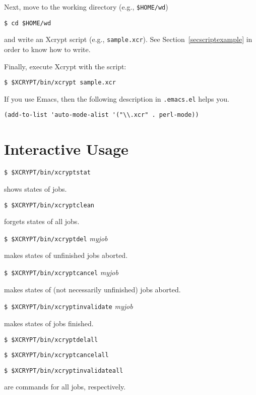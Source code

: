 \documentclass[a4paper,10pt]{report}
\begin{document}
Next, move to the working directory (e.g., \texttt{\$HOME/wd})
\begin{screen}
\texttt{\$ cd \$HOME/wd}
\end{screen}
and write an Xcrypt script (e.g., \texttt{sample.xcr}).  See
Section~\ref{secscriptexample} in order to know how to write.

Finally, execute Xcrypt with the script:
\begin{screen}
\texttt{\$ \$XCRYPT/bin/xcrypt sample.xcr}
\end{screen}

If you use Emacs, then the following description in \texttt{.emacs.el}
helps you.
\begin{boxnote}
\begin{verbatim}
(add-to-list 'auto-mode-alist '("\\.xcr" . perl-mode))
\end{verbatim}
\end{boxnote}

\section{Interactive Usage}

\begin{screen}
\texttt{\$ \$XCRYPT/bin/xcryptstat}
\end{screen}
shows states of jobs.

\begin{screen}
\texttt{\$ \$XCRYPT/bin/xcryptclean}
\end{screen}
forgets states of all jobs.

\begin{screen}
\texttt{\$ \$XCRYPT/bin/xcryptdel} \textit{myjob}
\end{screen}
makes states of unfinished jobs aborted.

\begin{screen}
\texttt{\$ \$XCRYPT/bin/xcryptcancel} \textit{myjob}
\end{screen}
makes states of (not necessarily unfinished) jobs aborted.

\begin{screen}
\texttt{\$ \$XCRYPT/bin/xcryptinvalidate} \textit{myjob}
\end{screen}
makes states of jobs finished.

\begin{screen}
\texttt{\$ \$XCRYPT/bin/xcryptdelall}
\end{screen}
\begin{screen}
\texttt{\$ \$XCRYPT/bin/xcryptcancelall}
\end{screen}
\begin{screen}
\texttt{\$ \$XCRYPT/bin/xcryptinvalidateall}
\end{screen}
are commands for all jobs, respectively.
\end{document}
